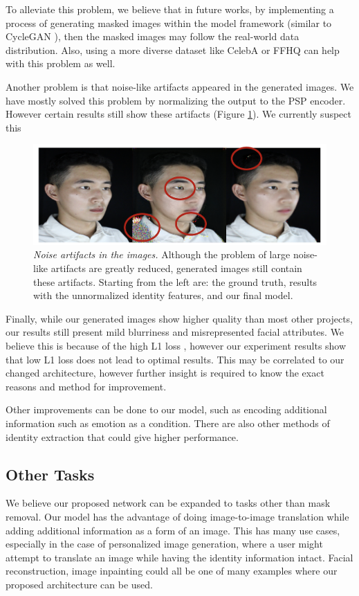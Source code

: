 \documentclass[sigconf,authorversion,nonacm]{acmart}
\begin{document}
To alleviate this problem, we believe that in future works, by implementing a process of generating masked images within the model framework (similar to CycleGAN \cite{CycleGAN}), then the masked images may follow the real-world data distribution. Also, using a more diverse dataset like CelebA \cite{CelebA} or FFHQ \cite{StyleGAN} can help with this problem as well.

Another problem is that noise-like artifacts appeared in the generated images. We have mostly solved this problem by normalizing the output to the PSP encoder. However certain results still show these artifacts (Figure \ref{images:noise-artifact}).
We currently suspect this 

\begin{figure}[ht]
  \centering
  \includegraphics[width=0.8\linewidth]{images/noise-artifacts.png}
  \caption{\emph{Noise artifacts in the images.} Although the problem of large noise-like artifacts are greatly reduced, generated images still contain these artifacts.
  Starting from the left are: the ground truth, results with the unnormalized identity features, and our final model.}
  \label{images:noise-artifact}
\end{figure}

Finally, while our generated images show higher quality than most other projects, our results
still present mild blurriness and misrepresented facial attributes. We believe this is because
of the high L1 loss \cite{Image-Restoration-Loss}, however our experiment results show that low L1 loss does not lead to optimal results. This may be correlated to our changed architecture, however further insight is required to know the exact reasons and method for improvement.

Other improvements can be done to our model, such as encoding additional information such as emotion as a condition. There are also other methods of identity extraction \cite{PersonalDiffusion} that could give higher performance.

\subsection{Other Tasks}
We believe our proposed network can be expanded to tasks other than mask removal. Our model has
the advantage of doing image-to-image translation while adding additional information as a form of
an image. This has many use cases, especially in the case of personalized image generation, where a user might attempt to translate an image while having the identity information intact. Facial reconstruction, image inpainting could all be one of many examples where our proposed architecture can be used.
\end{document}
